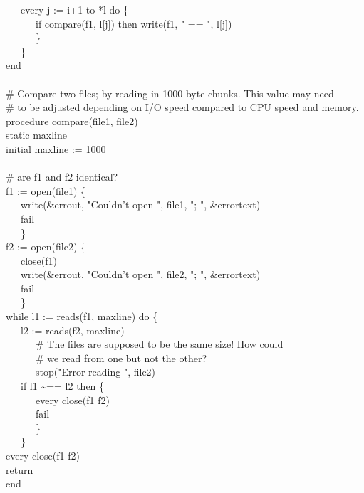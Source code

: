 {\>   \ \ \ every j := i+1 to *l do \{ \\
\>   \ \ \ \ \ \ if compare(f1, l[j]) then write(f1, " == ",
l[j]) \\
\>   \ \ \ \ \ \ \} \\
\>   \ \ \ \} \\
end \\
\ \\
\# Compare two files; by reading in 1000 byte chunks. This value may need\\
\# to be adjusted depending on I/O speed compared to CPU speed and memory. \\
procedure compare(file1, file2) \\
\>   static maxline \\
\>   initial maxline := 1000 \\
\ \\
\>   \# are f1 and f2 identical? \\
\>   f1 := open(file1) {\textbar} \{ \\
\>   \ \ \ write(\&errout, "Couldn't open ", file1, "; ", \&errortext) \\
\>   \ \ \ fail \\
\>   \ \ \ \} \\
\>   f2 := open(file2) {\textbar} \{ \\
\>   \ \ \ close(f1) \\
\>   \ \ \ write(\&errout, "Couldn't open ", file2, "; ", \&errortext) \\
\>   \ \ \ fail \\
\>   \ \ \ \} \\
\>   while l1 := reads(f1, maxline) do \{ \\
\>   \ \ \ l2 := reads(f2, maxline) {\textbar} \\
\>   \ \ \ \ \ \ \# The files are supposed to be the same size! How
could \\
\>   \ \ \ \ \ \ \# we read from one but not the other? \\
\>   \ \ \ \ \ \ stop("Error reading ",
file2) \\
\>   \ \ \ if l1 \~{}== l2 then \{ \\
\>   \ \ \ \ \ \ every close(f1 {\textbar} f2) \\
\>   \ \ \ \ \ \ fail \\
\>   \ \ \ \ \ \ \} \\
\>   \ \ \ \} \\
\>   every close(f1 {\textbar} f2) \\
\>   return \\
end
}

